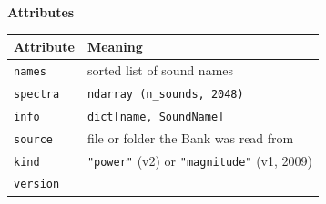 \documentclass[
  10pt,
]{article}
\begin{document}
\textbf{Attributes}

\begin{longtable}[]{@{}ll@{}}
\toprule
\begin{minipage}[b]{0.47\columnwidth}\raggedright
Attribute\strut
\end{minipage} &
\begin{minipage}[b]{0.47\columnwidth}\raggedright
Meaning\strut
\end{minipage}\tabularnewline
\midrule
\endhead
\begin{minipage}[t]{0.47\columnwidth}\raggedright
\texttt{names}\strut
\end{minipage} &
\begin{minipage}[t]{0.47\columnwidth}\raggedright
sorted list of sound names\strut
\end{minipage}\tabularnewline
\begin{minipage}[t]{0.47\columnwidth}\raggedright
\texttt{spectra}\strut
\end{minipage} &
\begin{minipage}[t]{0.47\columnwidth}\raggedright
\texttt{ndarray\ (n\_sounds,\ 2048)}\strut
\end{minipage}\tabularnewline
\begin{minipage}[t]{0.47\columnwidth}\raggedright
\texttt{info}\strut
\end{minipage} &
\begin{minipage}[t]{0.47\columnwidth}\raggedright
\texttt{dict{[}name,\ SoundName{]}}\strut
\end{minipage}\tabularnewline
\begin{minipage}[t]{0.47\columnwidth}\raggedright
\texttt{source}\strut
\end{minipage} &
\begin{minipage}[t]{0.47\columnwidth}\raggedright
file or folder the Bank was read from\strut
\end{minipage}\tabularnewline
\begin{minipage}[t]{0.47\columnwidth}\raggedright
\texttt{kind}\strut
\end{minipage} &
\begin{minipage}[t]{0.47\columnwidth}\raggedright
\texttt{"power"} (v2) or \texttt{"magnitude"} (v1,
2009)\strut
\end{minipage}\tabularnewline
\begin{minipage}[t]{0.47\columnwidth}\raggedright
\texttt{version}\strut
\end{minipage} &
\begin{minipage}[t]{0.47\columnwidth}\raggedright

\end{minipage}
\end{longtable}
\end{document}

